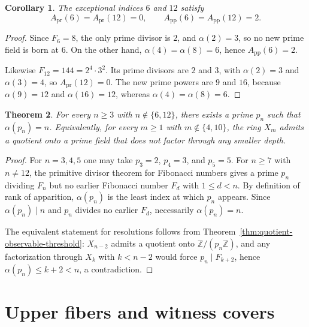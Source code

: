 \documentclass[11pt,letterpaper]{article}
\numberwithin{equation}{section}
\theoremstyle{plain}
\newtheorem{theorem}{Theorem}[section]
\newtheorem{corollary}[theorem]{Corollary}
\theoremstyle{definition}
\theoremstyle{remark}
\newcommand{\ZZ}{\mathbb{Z}}
\begin{document}
\begin{corollary}
\label{cor:birth-spectrum-exceptional}
The exceptional indices $6$ and $12$ satisfy
\[
A_{\mathrm{pr}}(6)=A_{\mathrm{pr}}(12)=0,
\qquad
A_{\mathrm{pp}}(6)=A_{\mathrm{pp}}(12)=2.
\]
\end{corollary}

\begin{proof}
Since $F_6=8$, the only prime divisor is $2$, and $\alpha(2)=3$, so no new
prime field is born at $6$. On the other hand, $\alpha(4)=\alpha(8)=6$, hence
$A_{\mathrm{pp}}(6)=2$.

Likewise $F_{12}=144=2^4\cdot 3^2$. Its prime divisors are $2$ and $3$, with
$\alpha(2)=3$ and $\alpha(3)=4$, so $A_{\mathrm{pr}}(12)=0$. The new prime
powers are $9$ and $16$, because $\alpha(9)=12$ and $\alpha(16)=12$, whereas
$\alpha(4)=\alpha(8)=6$.
\end{proof}

\begin{theorem}
\label{thm:primitive-field-quotients}
For every $n\ge 3$ with $n\notin\{6,12\}$, there exists a prime $p_n$ such
that $\alpha(p_n)=n$. Equivalently, for every $m\ge 1$ with $m\notin\{4,10\}$,
the ring $X_m$ admits a quotient onto a prime field that does not factor
through any smaller depth.
\end{theorem}

\begin{proof}
For $n=3,4,5$ one may take $p_3=2$, $p_4=3$, and $p_5=5$. For $n\ge 7$ with
$n\neq 12$, the primitive divisor theorem for Fibonacci numbers
\cite{Yabuta2001PrimitiveDivisorFibonacci,BiluHanrotVoutier2001PrimitiveDivisorsLucas}
gives a prime $p_n$ dividing $F_n$ but no earlier Fibonacci number $F_d$ with
$1\le d<n$. By definition of rank of apparition, $\alpha(p_n)$ is the least
index at which $p_n$ appears. Since $\alpha(p_n)\mid n$ and $p_n$ divides no
earlier $F_d$, necessarily $\alpha(p_n)=n$.

The equivalent statement for resolutions follows from
Theorem~\ref{thm:quotient-observable-threshold}: $X_{n-2}$ admits a quotient
onto $\ZZ/(p_n\ZZ)$, and any factorization through $X_k$ with $k<n-2$ would
force $p_n\mid F_{k+2}$, hence $\alpha(p_n)\le k+2<n$, a contradiction.
\end{proof}

\section{Upper fibers and witness covers}
\end{document}
